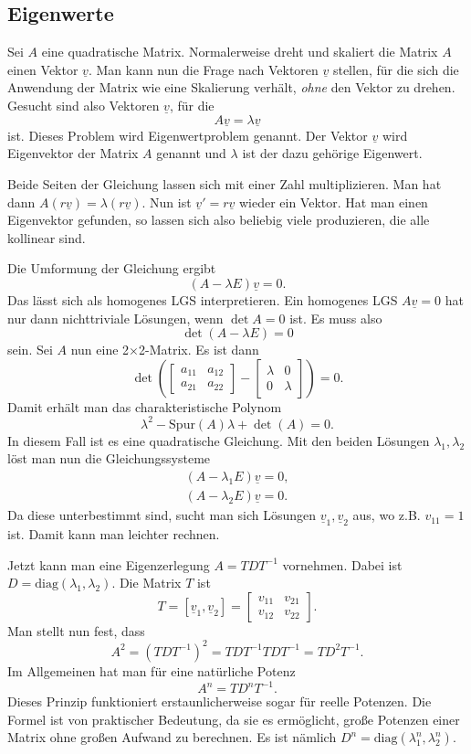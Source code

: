\documentclass[a4paper,10pt,fleqn,twocolumn,twoside]{article}
\begin{document}
\subsection{Eigenwerte}

Sei $A$ eine quadratische Matrix. Normalerweise dreht und skaliert
die Matrix $A$ einen Vektor $\underline v$. Man kann nun die Frage
nach Vektoren $\underline v$ stellen, für die sich die Anwendung
der Matrix wie eine Skalierung verhält, \textit{ohne} den Vektor zu
drehen. Gesucht sind also Vektoren $\underline v$, für die
\[A\underline v = \lambda\underline v\]
ist. Dieses Problem wird Eigenwertproblem genannt. Der Vektor
$\underline v$ wird Eigenvektor der Matrix $A$ genannt und
$\lambda$ ist der dazu gehörige Eigenwert.

Beide Seiten der Gleichung lassen sich mit einer Zahl multiplizieren.
Man hat dann $A(r\underline v)=\lambda(r\underline v)$.
Nun ist $\underline v'=r\underline v$ wieder ein Vektor.
Hat man einen Eigenvektor gefunden, so lassen sich also beliebig
viele produzieren, die alle kollinear sind.

Die Umformung der Gleichung ergibt
\[(A-\lambda E)\underline v=0.\]
Das lässt sich als homogenes LGS interpretieren. Ein homogenes LGS
$A\underline v=0$ hat nur dann nichttriviale Lösungen,
wenn $\det A=0$ ist. Es muss also
\[\det(A-\lambda E)=0\]
sein. Sei $A$ nun eine 2$\times$2-Matrix. Es ist dann
\[\det\left(\begin{bmatrix}a_{11} & a_{12}\\
a_{21} & a_{22}\end{bmatrix}-
\begin{bmatrix}\lambda & 0\\
0 & \lambda\end{bmatrix}\right)=0.\]
Damit erhält man das charakteristische Polynom
\[\lambda^2 -\mathrm{Spur}(A)\lambda+\det(A)=0.\]
In diesem Fall ist es eine quadratische Gleichung.
Mit den beiden Lösungen $\lambda_1,\lambda_2$ löst man nun
die Gleichungssysteme
\begin{gather*}
(A-\lambda_1 E)\underline v=0,\\
(A-\lambda_2 E)\underline v=0.
\end{gather*}
Da diese unterbestimmt sind, sucht man sich Lösungen
$\underline v_1,\underline v_2$ aus, wo z.B. $v_{11}=1$ ist.
Damit kann man leichter rechnen.

Jetzt kann man eine Eigenzerlegung $A=TDT^{-1}$ vornehmen.
Dabei ist $D=\mathrm{diag}(\lambda_1,\lambda_2)$.
Die Matrix $T$ ist
\[T=[\underline v_1, \underline v_2]=\begin{bmatrix}
v_{11} & v_{21}\\
v_{12} & v_{22}
\end{bmatrix}.\]
Man stellt nun fest, dass
\[A^2 = (TDT^{-1})^2 = TDT^{-1}TDT^{-1} = TD^2T^{-1}.\]
Im Allgemeinen hat man für eine natürliche Potenz
\[A^n = TD^nT^{-1}.\]
Dieses Prinzip funktioniert erstaunlicherweise sogar für reelle
Potenzen. Die Formel ist von praktischer Bedeutung, da sie es
ermöglicht, große Potenzen einer Matrix ohne großen Aufwand zu
berechnen. Es ist nämlich
$D^n=\mathrm{diag}(\lambda_1^n,\lambda_2^n)$.
\end{document}
